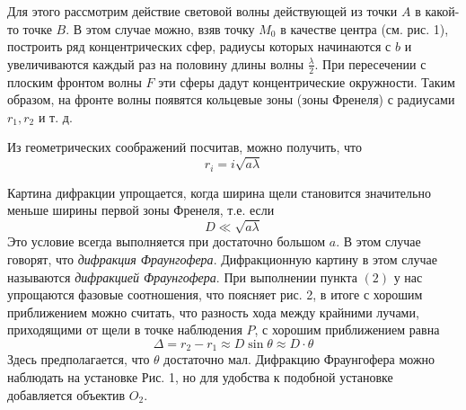 \documentclass[a4paper,12pt]{article}
\begin{document}
Для этого рассмотрим действие световой волны действующей из точки $A$ в какой-то точке $B$.
В этом случае можно, взяв точку $M_0$ в качестве центра (см. рис. 1), построить ряд концентрических сфер, радиусы которых начинаются с $b$ и увеличиваются каждый раз на половину длины волны $\frac{\lambda}{2}$. При пересечении с плоским фронтом волны $F$ эти сферы дадут концентрические окружности. Таким образом, на фронте волны появятся кольцевые зоны (зоны Френеля) с радиусами $r_1, r_2$ и т. д.

Из геометрических соображений посчитав, можно получить, что 
\begin{equation}
r_i = i \sqrt{a \lambda}
\end{equation}

Картина дифракции упрощается, когда ширина щели становится значительно меньше ширины первой зоны Френеля, т.е. если 
\begin{equation}
D \ll\sqrt{a \lambda} 
\end{equation}	
Это условие всегда выполняется при достаточно большом $a$. В этом случае говорят, что \textit{дифракция Фраунгофера}. Дифракционную картину в этом случае называются \textit{дифракцией Фраунгофера}. При выполнении пункта $(2)$ у нас упрощаются фазовые соотношения, что поясняет рис. 2, в итоге с хорошим приближением можно считать, что разность хода между крайними лучами, приходящими от щели в точке наблюдения $P$, с хорошим приближением равна 
\begin{equation}
\Delta = r_2 - r_1 \approx D \sin \theta \approx D \cdot \theta
\end{equation}
Здесь предполагается, что $\theta$ достаточно мал.
Дифракцию Фраунгофера можно наблюдать на установке Рис. 1, но для удобства к подобной установке добавляется объектив $O_2$.
\end{document}
